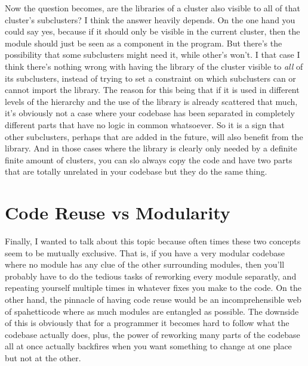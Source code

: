 \documentclass{article}
\begin{document}
Now the question becomes, are the libraries of a cluster also visible to all of that cluster's subclusters? I think the answer heavily depends.
On the one hand you could say yes, because if it should only be visible in the current cluster, then the module should just be seen as a component in the program.
But there's the possibility that some subclusters might need it, while other's won't.
I that case I think there's nothing wrong with having the library of the cluster visible to {\it all} of its subclusters, instead of trying to set a constraint on which subclusters can or cannot import the library. The reason for this being that if it is used in different levels of the hierarchy and the use of the library is already scattered that much, it's obviously not a case where your codebase has been separated in completely different parts that have no logic in common whatsoever. So it is a sign that other subclusters, perhaps that are added in the future, will also benefit from the library.
And in those cases where the library is clearly only needed by a definite finite amount of clusters, you can slo always copy the code and have two parts that are totally unrelated in your codebase but they do the same thing.

\section{Code Reuse vs Modularity}
Finally, I wanted to talk about this topic because often times these two concepts seem to be mutually exclusive.
That is, if you have a very modular codebase where no module has any clue of the other surrounding modules, then you'll probably have to do the tedious tasks of reworking every module separatly, and repeating yourself multiple times in whatever fixes you make to the code.
On the other hand, the pinnacle of having code reuse would be an incomprehensible web of spahetticode where as much modules are entangled as possible.
The downside of this is obviously that for a programmer it becomes hard to follow what the codebase actually does, plus, the power of reworking many parts of the codebase all at once actually backfires when you want something to change at one place but not at the other.
\end{document}
